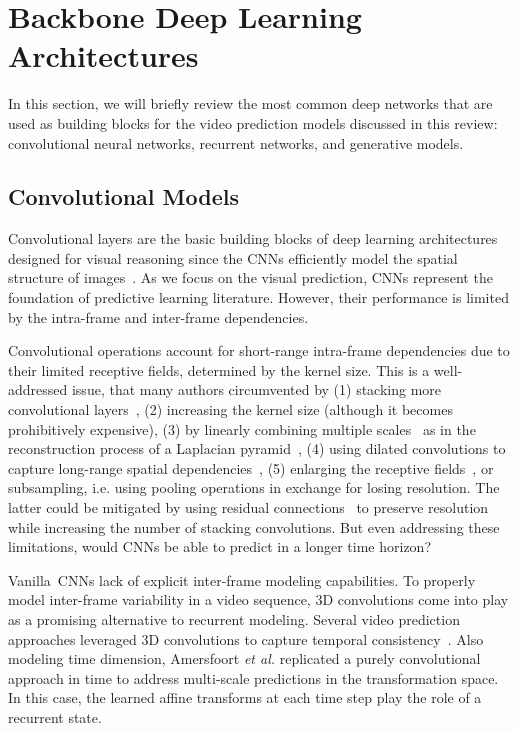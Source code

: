 \section{Backbone Deep Learning Architectures}
\label{cha:videoprediction:sec:background}
In this section, we will briefly review the most common deep networks that are used as building blocks for the video prediction models discussed in this review: convolutional neural networks, recurrent networks, and generative models.

\subsection{Convolutional Models}
Convolutional layers are the basic building blocks of deep learning architectures designed for visual reasoning since the \acp{CNN} efficiently model the spatial structure of images~\cite{Lecun1998}. As we focus on the visual prediction, \acp{CNN} represent the foundation of predictive learning literature. However, their performance is limited by the intra-frame and inter-frame dependencies.

Convolutional operations account for short-range intra-frame dependencies due to their limited receptive fields, determined by the kernel size. This is a well-addressed issue, that many authors circumvented by (1) stacking more convolutional layers~\cite{Jain2007}, (2) increasing the kernel size (although it becomes prohibitively expensive), (3) by linearly combining multiple scales~\cite{Mathieu2016} as in the reconstruction process of a Laplacian pyramid~\cite{Denton2015}, (4) using dilated convolutions to capture long-range spatial dependencies~\cite{Yu2017}, (5) enlarging the receptive fields~\cite{Chen2018, Luo2016}, or subsampling, i.e. using pooling operations in exchange for losing resolution. The latter could be mitigated by using residual connections~\cite{He2016,Villegas2017a} to preserve resolution while increasing the number of stacking convolutions. But even addressing these limitations, would \acp{CNN} be able to predict in a longer time horizon?

Vanilla~\acp{CNN} lack of explicit inter-frame modeling capabilities. To properly model inter-frame variability in a video sequence, 3D convolutions come into play as a promising alternative to recurrent modeling. Several video prediction approaches leveraged 3D convolutions to capture temporal consistency~\cite{Wang2019b,Vondrick2016,Tulyakov2018,Aigner2018,Zhang2019}. Also modeling time dimension, Amersfoort \textit{et al.} \cite{Amersfoort2017} replicated a purely convolutional approach in time to address multi-scale predictions in the transformation space. In this case, the learned affine transforms at each time step play the role of a recurrent state.


